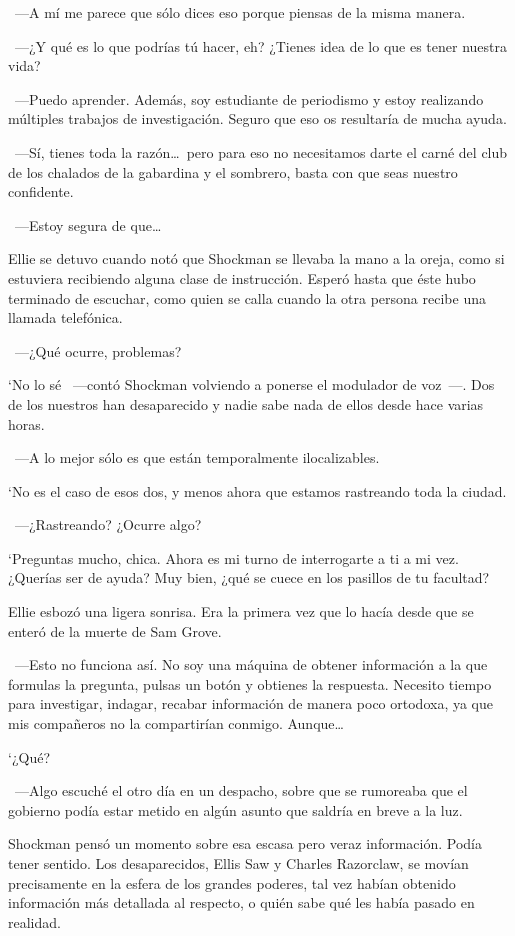 ~---A mí me parece que sólo dices eso porque piensas de la misma manera.

~---¿Y qué es lo que podrías tú hacer, eh? ¿Tienes idea de lo que es tener nuestra vida?

~---Puedo aprender. Además, soy estudiante de periodismo y estoy realizando múltiples trabajos de investigación. Seguro que eso os resultaría de mucha ayuda.

~---Sí, tienes toda la razón\dots\ pero para eso no necesitamos darte el carné del club de los chalados de la gabardina y el sombrero, basta con que seas nuestro confidente.

~---Estoy segura de que\dots

Ellie se detuvo cuando notó que Shockman se llevaba la mano a la oreja, como si estuviera recibiendo alguna clase de instrucción. Esperó hasta que éste hubo terminado de escuchar, como quien se calla cuando la otra persona recibe una llamada telefónica.

~---¿Qué ocurre, problemas?

‘No lo sé ~---contó Shockman volviendo a ponerse el modulador de voz~---. Dos de los nuestros han desaparecido y nadie sabe nada de ellos desde hace varias horas.

~---A lo mejor sólo es que están temporalmente ilocalizables.

‘No es el caso de esos dos, y menos ahora que estamos rastreando toda la ciudad.

~---¿Rastreando? ¿Ocurre algo?

‘Preguntas mucho, chica. Ahora es mi turno de interrogarte a ti a mi vez. ¿Querías ser de ayuda? Muy bien, ¿qué se cuece en los pasillos de tu facultad?

Ellie esbozó una ligera sonrisa. Era la primera vez que lo hacía desde que se enteró de la muerte de Sam Grove.

~---Esto no funciona así. No soy una máquina de obtener información a la que formulas la pregunta, pulsas un botón y obtienes la respuesta. Necesito tiempo para investigar, indagar, recabar información de manera poco ortodoxa, ya que mis compañeros no la compartirían conmigo. Aunque\dots

‘¿Qué?

~---Algo escuché el otro día en un despacho, sobre que se rumoreaba que el gobierno podía estar metido en algún asunto que saldría en breve a la luz.

Shockman pensó un momento sobre esa escasa pero veraz información. Podía tener sentido. Los desaparecidos, Ellis Saw y Charles Razorclaw, se movían precisamente en la esfera de los grandes poderes, tal vez habían obtenido información más detallada al respecto, o quién sabe qué les había pasado en realidad.

